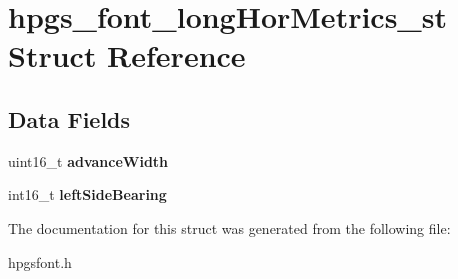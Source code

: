 \section{hpgs\_\-font\_\-longHorMetrics\_\-st Struct Reference}
\label{structhpgs__font__longHorMetrics__st}
\subsection*{Data Fields}
\begin{DoxyCompactItemize}
\item 
uint16\_\-t {\bfseries advanceWidth}\label{structhpgs__font__longHorMetrics__st_a4c1c9688fea70c8254eede08672a2557}

\item 
int16\_\-t {\bfseries leftSideBearing}\label{structhpgs__font__longHorMetrics__st_ad3e0c32aac6c7f90041c0ff1b8e153a4}

\end{DoxyCompactItemize}


The documentation for this struct was generated from the following file:\begin{DoxyCompactItemize}
\item 
hpgsfont.h\end{DoxyCompactItemize}
